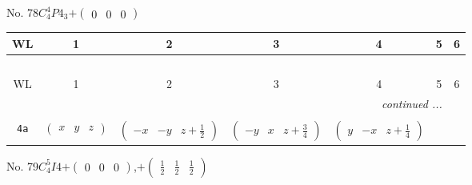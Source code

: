 \documentclass[fleqn,9pt,landscape]{jsarticle}
\begin{document}
\newpage
No. 78\quad$C_{4}^{4}$\quad$P4_3$\quad[ tetragonal ]\quad$+\begin{pmatrix} 0 & 0 & 0 \end{pmatrix}$
\begin{center}
\renewcommand{\arraystretch}{1.2}
\begin{longtable}{ccccccc}
 \hline \hline
WL & 1 & 2 & 3 & 4 & 5 & 6 \\ \hline \endfirsthead

\multicolumn{6}{l}{\tablename\ \thetable{}} \\
 \hline \hline
WL & 1 & 2 & 3 & 4 & 5 & 6 \\ \hline \endhead

 \hline \hline
\multicolumn{6}{r}{\footnotesize\it continued ...} \\ \endfoot

 \hline \hline
\multicolumn{6}{r}{} \\ \endlastfoot

{\tt 4a} & $ \begin{pmatrix} x & y & z \end{pmatrix} $ & $ \begin{pmatrix} - x & - y & z + \frac{1}{2} \end{pmatrix} $ & $ \begin{pmatrix} - y & x & z + \frac{3}{4} \end{pmatrix} $ & $ \begin{pmatrix} y & - x & z + \frac{1}{4} \end{pmatrix} $ \\
\end{longtable}
\end{center}
\newpage
No. 79\quad$C_{4}^{5}$\quad$I4$\quad[ tetragonal ]\quad$+\begin{pmatrix} 0 & 0 & 0 \end{pmatrix}$,\quad $+\begin{pmatrix} \frac{1}{2} & \frac{1}{2} & \frac{1}{2} \end{pmatrix}$
\end{document}
